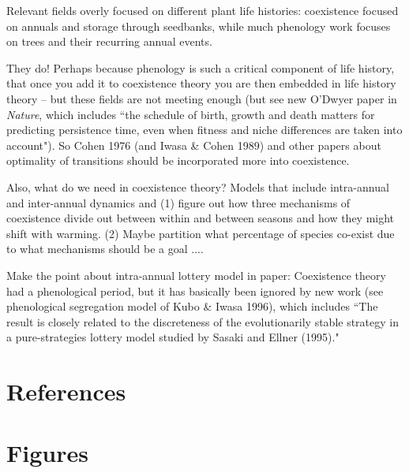 \documentclass[11pt]{article}
\begin{document}
Relevant fields overly focused on different plant life histories: coexistence focused on annuals and storage through seedbanks, while much phenology work focuses on trees and their recurring annual events. 

They do! Perhaps because phenology is such a critical component of life history, that once you add it to coexistence theory you are then embedded in life history theory -- but these fields are not meeting enough (but see new O'Dwyer paper in \emph{Nature}, which includes ``the schedule of birth, growth and death matters for predicting persistence time, even when fitness and niche differences are taken into account"). So Cohen 1976 (and Iwasa \& Cohen 1989) and other papers about optimality of transitions should be incorporated more into coexistence. 

Also, what do we need in coexistence theory? Models that include intra-annual and inter-annual dynamics and (1) figure out how three mechanisms of coexistence divide out between within and between seasons and how they might shift with warming. (2) Maybe partition what percentage of species co-exist due to what mechanisms should be a goal .... 

Make the point about intra-annual lottery model in paper: Coexistence theory had a phenological period, but it has basically been ignored by new work (see phenological segregation model of Kubo \& Iwasa 1996), which includes ``The result is closely related to the discreteness of the evolutionarily stable strategy in a pure-strategies lottery model studied by Sasaki and Ellner (1995)." 


\newpage
\section{References}


\newpage
\section{Figures}

\end{document}
